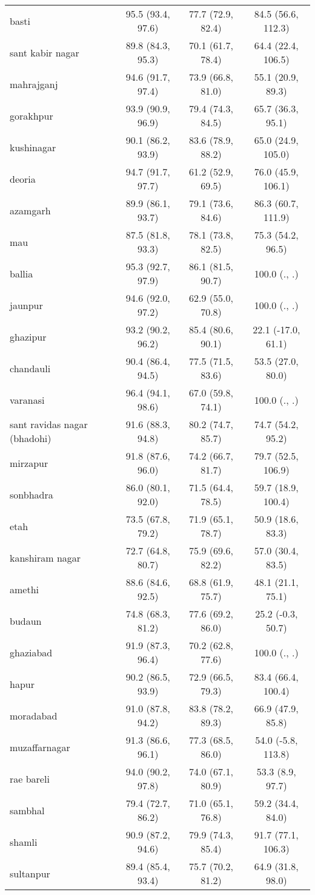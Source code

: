 \begin{tabular}{lccc}
basti&95.5 (93.4, 97.6)&77.7 (72.9, 82.4)&84.5 (56.6, 112.3)\\
sant kabir nagar&89.8 (84.3, 95.3)&70.1 (61.7, 78.4)&64.4 (22.4, 106.5)\\
mahrajganj&94.6 (91.7, 97.4)&73.9 (66.8, 81.0)&55.1 (20.9, 89.3)\\
gorakhpur&93.9 (90.9, 96.9)&79.4 (74.3, 84.5)&65.7 (36.3, 95.1)\\
kushinagar&90.1 (86.2, 93.9)&83.6 (78.9, 88.2)&65.0 (24.9, 105.0)\\
deoria&94.7 (91.7, 97.7)&61.2 (52.9, 69.5)&76.0 (45.9, 106.1)\\
azamgarh&89.9 (86.1, 93.7)&79.1 (73.6, 84.6)&86.3 (60.7, 111.9)\\
mau&87.5 (81.8, 93.3)&78.1 (73.8, 82.5)&75.3 (54.2, 96.5)\\
ballia&95.3 (92.7, 97.9)&86.1 (81.5, 90.7)&100.0 (., .)\\
jaunpur&94.6 (92.0, 97.2)&62.9 (55.0, 70.8)&100.0 (., .)\\
ghazipur&93.2 (90.2, 96.2)&85.4 (80.6, 90.1)&22.1 (-17.0, 61.1)\\
chandauli&90.4 (86.4, 94.5)&77.5 (71.5, 83.6)&53.5 (27.0, 80.0)\\
varanasi&96.4 (94.1, 98.6)&67.0 (59.8, 74.1)&100.0 (., .)\\
sant ravidas nagar (bhadohi)&91.6 (88.3, 94.8)&80.2 (74.7, 85.7)&74.7 (54.2, 95.2)\\
mirzapur&91.8 (87.6, 96.0)&74.2 (66.7, 81.7)&79.7 (52.5, 106.9)\\
sonbhadra&86.0 (80.1, 92.0)&71.5 (64.4, 78.5)&59.7 (18.9, 100.4)\\
etah&73.5 (67.8, 79.2)&71.9 (65.1, 78.7)&50.9 (18.6, 83.3)\\
kanshiram nagar&72.7 (64.8, 80.7)&75.9 (69.6, 82.2)&57.0 (30.4, 83.5)\\
amethi&88.6 (84.6, 92.5)&68.8 (61.9, 75.7)&48.1 (21.1, 75.1)\\
budaun&74.8 (68.3, 81.2)&77.6 (69.2, 86.0)&25.2 (-0.3, 50.7)\\
ghaziabad&91.9 (87.3, 96.4)&70.2 (62.8, 77.6)&100.0 (., .)\\
hapur&90.2 (86.5, 93.9)&72.9 (66.5, 79.3)&83.4 (66.4, 100.4)\\
moradabad&91.0 (87.8, 94.2)&83.8 (78.2, 89.3)&66.9 (47.9, 85.8)\\
muzaffarnagar&91.3 (86.6, 96.1)&77.3 (68.5, 86.0)&54.0 (-5.8, 113.8)\\
rae bareli&94.0 (90.2, 97.8)&74.0 (67.1, 80.9)&53.3 (8.9, 97.7)\\
sambhal&79.4 (72.7, 86.2)&71.0 (65.1, 76.8)&59.2 (34.4, 84.0)\\
shamli&90.9 (87.2, 94.6)&79.9 (74.3, 85.4)&91.7 (77.1, 106.3)\\
sultanpur&89.4 (85.4, 93.4)&75.7 (70.2, 81.2)&64.9 (31.8, 98.0)\\
\bottomrule
\end{tabular}
